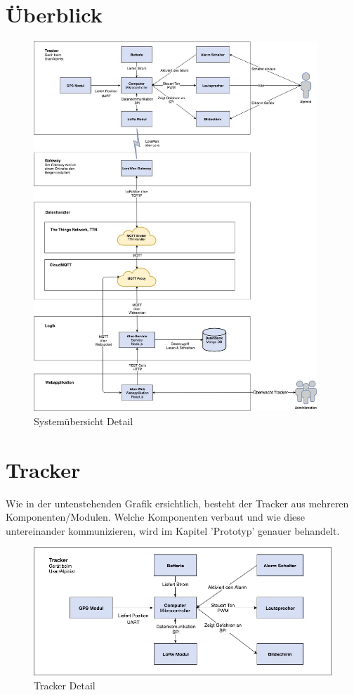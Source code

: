 \documentclass[11pt,english,german]{report}
\theoremstyle{definition}
\begin{document}
\newpage
\section{Überblick}
\begin{figure}[H]
	\centering
	\includegraphics[width=0.95\textwidth]{img/system/ATAS_SystemOverview_Detail_BA.jpg}
	\caption[Systemübersicht Detail]
	{Systemübersicht Detail}
\end{figure}

\newpage
\section{Tracker}
Wie in der untenstehenden Grafik ersichtlich, besteht der Tracker aus mehreren Komponenten/Modulen. Welche Komponenten verbaut und wie diese untereinander kommunizieren, wird im Kapitel 'Prototyp' genauer behandelt.
\begin{figure}[H]
	\centering
	\includegraphics[width=\textwidth]{img/system/ATAS_SystemOverview_Tracker_BA.jpg}
	\caption[Tracker Detail]
	{Tracker Detail}
\end{figure}
\end{document}
